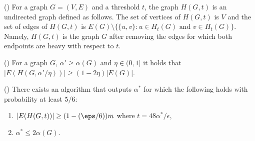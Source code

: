 \begin{definition}(\cite{})
For a graph $G = (V, E)$ and a threshold $t$, the graph $H(G, t)$ is an undirected graph defined as follows.
The set of vertices of $H(G, t)$ is $V$ and the set of edges of $H(G, t)$ is $E(G)\setminus \{\{u, v\} : u\in H_t(G) \text{ and } v \in H_t(G)\}$.
Namely, $H(G, t)$ is the graph $G$ after removing the edges for which both endpoints are heavy with respect to $t$.
\end{definition}

\begin{claim}\label{clm:arb}(\cite{})
For a graph $G$, $\alpha' \geq \alpha(G)$ and $\eta\in (0,1]$ it holds that $|E(H(G, \alpha'/\eta))| \geq (1-2\eta)|E(G)|$.
\end{claim}


\begin{claim}\label{lem:alpha}(\cite{})
There exists an algorithm that outputs $\alpha^*$ for which the following holds with probability at least $5/6$:
\begin{enumerate}
\item $|E(H(G, t))| \geq (1-(\eps/6))m$ where $t = 48\alpha^*/\epsilon$,
\item $\alpha^* \leq 2 \alpha(G)$.
\end{enumerate}
\end{claim}
\fi

